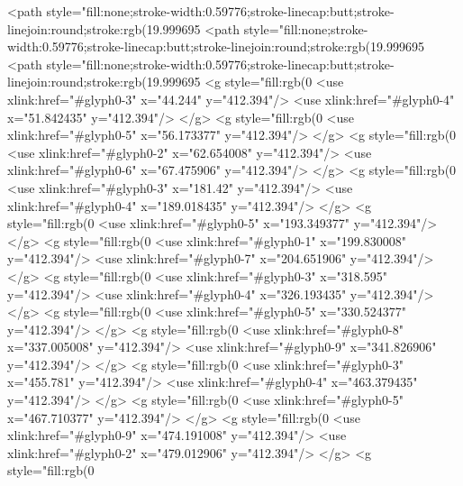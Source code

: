 <path style="fill:none;stroke-width:0.59776;stroke-linecap:butt;stroke-linejoin:round;stroke:rgb(19.999695%
<path style="fill:none;stroke-width:0.59776;stroke-linecap:butt;stroke-linejoin:round;stroke:rgb(19.999695%
<path style="fill:none;stroke-width:0.59776;stroke-linecap:butt;stroke-linejoin:round;stroke:rgb(19.999695%
<g style="fill:rgb(0%
  <use xlink:href="#glyph0-3" x="44.244" y="412.394"/>
  <use xlink:href="#glyph0-4" x="51.842435" y="412.394"/>
</g>
<g style="fill:rgb(0%
  <use xlink:href="#glyph0-5" x="56.173377" y="412.394"/>
</g>
<g style="fill:rgb(0%
  <use xlink:href="#glyph0-2" x="62.654008" y="412.394"/>
  <use xlink:href="#glyph0-6" x="67.475906" y="412.394"/>
</g>
<g style="fill:rgb(0%
  <use xlink:href="#glyph0-3" x="181.42" y="412.394"/>
  <use xlink:href="#glyph0-4" x="189.018435" y="412.394"/>
</g>
<g style="fill:rgb(0%
  <use xlink:href="#glyph0-5" x="193.349377" y="412.394"/>
</g>
<g style="fill:rgb(0%
  <use xlink:href="#glyph0-1" x="199.830008" y="412.394"/>
  <use xlink:href="#glyph0-7" x="204.651906" y="412.394"/>
</g>
<g style="fill:rgb(0%
  <use xlink:href="#glyph0-3" x="318.595" y="412.394"/>
  <use xlink:href="#glyph0-4" x="326.193435" y="412.394"/>
</g>
<g style="fill:rgb(0%
  <use xlink:href="#glyph0-5" x="330.524377" y="412.394"/>
</g>
<g style="fill:rgb(0%
  <use xlink:href="#glyph0-8" x="337.005008" y="412.394"/>
  <use xlink:href="#glyph0-9" x="341.826906" y="412.394"/>
</g>
<g style="fill:rgb(0%
  <use xlink:href="#glyph0-3" x="455.781" y="412.394"/>
  <use xlink:href="#glyph0-4" x="463.379435" y="412.394"/>
</g>
<g style="fill:rgb(0%
  <use xlink:href="#glyph0-5" x="467.710377" y="412.394"/>
</g>
<g style="fill:rgb(0%
  <use xlink:href="#glyph0-9" x="474.191008" y="412.394"/>
  <use xlink:href="#glyph0-2" x="479.012906" y="412.394"/>
</g>
<g style="fill:rgb(0%

